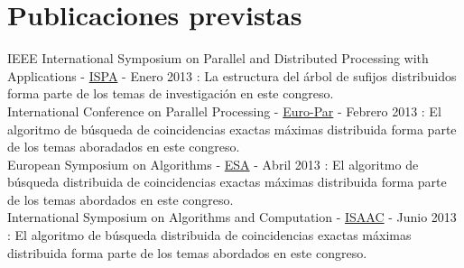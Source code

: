 \documentclass[12pt,a4paper]{article}
\begin{document}
\section{Publicaciones previstas}
IEEE International Symposium on Parallel and Distributed Processing with Applications - \href{http://www.arcos.inf.uc3m.es/ispa12/}{ISPA} - Enero 2013 : La estructura del árbol de sufijos distribuidos forma parte de los temas de investigación en este congreso.\\
International Conference on Parallel Processing - \href{http://www.grs-sim.de/news-events/news-archive/euro-par-2013.html}{Euro-Par} - Febrero 2013 : El algoritmo de búsqueda de coincidencias exactas máximas distribuida forma parte de los temas aboradados en este congreso.\\
European Symposium on Algorithms - \href{http://esa-symposium.org/}{ESA} - Abril 2013 : El algoritmo de búsqueda distribuida de coincidencias exactas máximas distribuida forma parte de los temas abordados en este congreso.\\
International Symposium on Algorithms and Computation - \href{http://www.is.titech.ac.jp/isaac11/}{ISAAC} - Junio 2013 :  El algoritmo de búsqueda distribuida de coincidencias exactas máximas distribuida forma parte de los temas abordados en este congreso.\\
\end{document}

